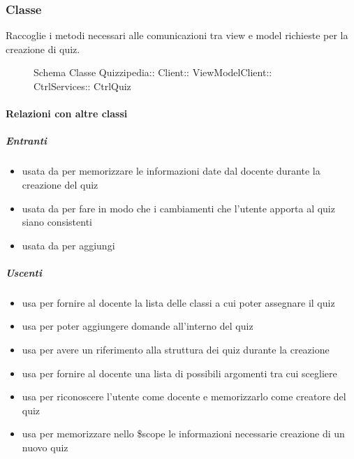 \subsubsection{Classe }
Raccoglie i metodi necessari alle comunicazioni tra view e model richieste per la creazione di quiz.
\begin{figure}[H]
\centering
\noindent{}
\caption[Schema Classe CtrlQuiz]{Schema Classe Quizzipedia:: Client:: ViewModelClient:: CtrlServices:: CtrlQuiz}
\end{figure}
\paragraph{Relazioni con altre classi}
\subparagraph{Entranti}
\begin{itemize}
\item usata da  per memorizzare le informazioni date dal docente durante la creazione del quiz
\item usata da  per fare in modo che i cambiamenti che l'utente apporta al quiz siano consistenti
\item usata da  per aggiungi
\end{itemize}
\subparagraph{Uscenti}
\begin{itemize}
\item usa  per fornire al docente la lista delle classi a cui poter assegnare il quiz
\item usa  per poter aggiungere domande all'interno del quiz
\item usa  per avere un riferimento alla struttura dei quiz durante la creazione
\item usa  per fornire al docente una lista di possibili argomenti tra cui scegliere
\item usa  per riconoscere l'utente come docente e memorizzarlo come creatore del quiz
\item usa  per memorizzare nello \$scope le informazioni necessarie creazione di un nuovo quiz
\end{itemize}
